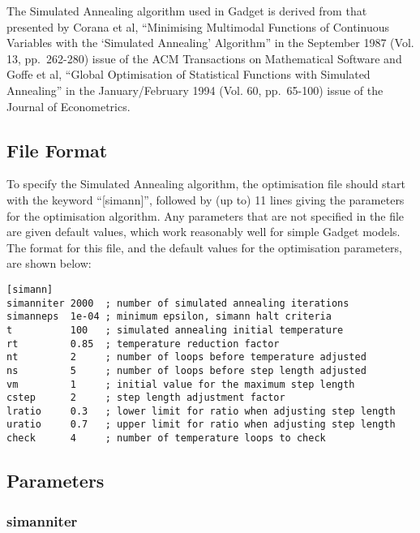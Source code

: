 \documentclass[]{book}
\begin{document}
The Simulated Annealing algorithm used in Gadget is derived from that
presented by Corana et al, ``Minimising Multimodal Functions of
Continuous Variables with the `Simulated Annealing' Algorithm'' in the
September 1987 (Vol. 13, pp.~262-280) issue of the ACM Transactions on
Mathematical Software and Goffe et al, ``Global Optimisation of
Statistical Functions with Simulated Annealing'' in the January/February
1994 (Vol. 60, pp.~65-100) issue of the Journal of Econometrics.

\hypertarget{subsec:simannfile}{%
\subsection{File Format}\label{subsec:simannfile}}

To specify the Simulated Annealing algorithm, the optimisation file
should start with the keyword ``{[}simann{]}'', followed by (up to) 11 lines
giving the parameters for the optimisation algorithm. Any parameters
that are not specified in the file are given default values, which work
reasonably well for simple Gadget models. The format for this file, and
the default values for the optimisation parameters, are shown below:

\begin{verbatim}
[simann]
simanniter 2000  ; number of simulated annealing iterations
simanneps  1e-04 ; minimum epsilon, simann halt criteria
t          100   ; simulated annealing initial temperature
rt         0.85  ; temperature reduction factor
nt         2     ; number of loops before temperature adjusted
ns         5     ; number of loops before step length adjusted
vm         1     ; initial value for the maximum step length
cstep      2     ; step length adjustment factor
lratio     0.3   ; lower limit for ratio when adjusting step length
uratio     0.7   ; upper limit for ratio when adjusting step length
check      4     ; number of temperature loops to check
\end{verbatim}

\hypertarget{subsec:simannpar}{%
\subsection{Parameters}\label{subsec:simannpar}}

\hypertarget{simanniter}{%
\subsubsection{simanniter}\label{simanniter}}
\end{document}
